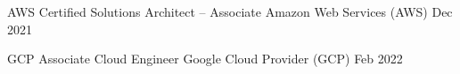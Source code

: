 

\begin{cvhonors}

  \cvhonor
    {AWS Certified Solutions Architect – Associate} %
    {Amazon Web Services (AWS)} %
    {} %
    {Dec 2021} %

  \cvhonor
    {GCP Associate Cloud Engineer} %
    {Google Cloud Provider (GCP)} %
    {} %
    {Feb 2022} %

\end{cvhonors}
